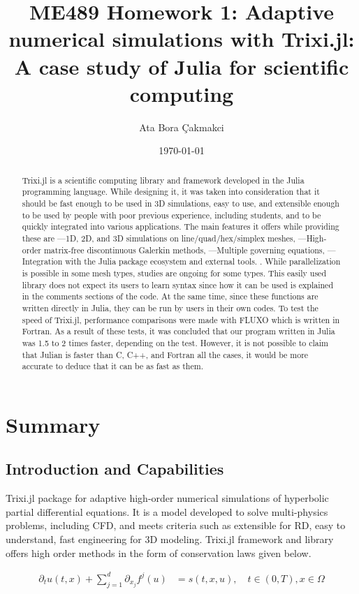 \documentclass{article}
\title{ME489 Homework 1: Adaptive numerical simulations with Trixi.jl: A case study of Julia for scientific computing}
\author{Ata Bora Çakmakci}
\date{\today}
\begin{document}
\maketitle

\begin{abstract}
Trixi.jl is a scientific computing library and framework developed in the Julia programming language. While designing it, it was taken into consideration that it should be fast enough to be used in 3D simulations, easy to use, and extensible enough to be used by people with poor previous experience, including students, and to be quickly integrated into various applications. The main features it offers while providing these are —1D, 2D, and 3D simulations on line/quad/hex/simplex meshes, —High-order matrix-free discontinuous Galerkin methods, —Multiple governing equations, —Integration with the Julia package ecosystem and external tools. . While parallelization is possible in some mesh types, studies are ongoing for some types. This easily used library does not expect its users to learn syntax since how it can be used is explained in the comments sections of the code. At the same time, since these functions are written directly in Julia, they can be run by users in their own codes. To test the speed of Trixi.jl, performance comparisons were made with FLUXO which is written in Fortran. As a result of these tests, it was concluded that our program written in Julia was 1.5 to 2 times faster, depending on the test. However, it is not possible to claim that Julian is faster than C, C++, and Fortran all the cases, it would be more accurate to deduce that it can be as fast as them.
\end{abstract}
\section{Summary}
\subsection{Introduction and Capabilities}

Trixi.jl package for adaptive high-order numerical simulations of hyperbolic partial differential equations. It is a model developed to solve multi-physics problems, including CFD, and meets criteria such as extensible for RD, easy to understand, fast engineering for 3D modeling. Trixi.jl framework and library offers high order methods in the form of conservation laws given below.


\begin{align}
    \tag{1}\label{eq:1}
    \partial_t u(t, x) + \sum_{j=1}^d \partial_{x_j} f^j(u) &= s(t, x, u), \quad t \in (0, T), x \in \Omega
\end{align}
\end{document}
